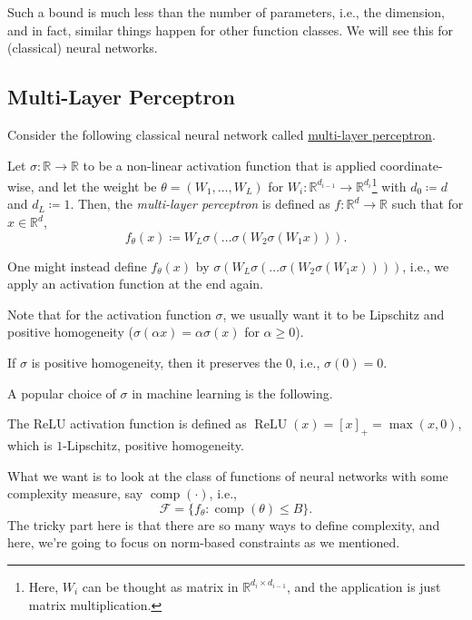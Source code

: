 Such a bound is much less than the number of parameters, i.e., the dimension, and in fact, similar things happen for other function classes. We will see this for (classical) neural networks.

\subsection{Multi-Layer Perceptron}
Consider the following classical neural network called \hyperref[def:MLP]{multi-layer perceptron}.

\begin{definition}\label{def:MLP}
	Let \(\sigma \colon \mathbb{R} \to \mathbb{R} \) to be a non-linear activation function that is applied coordinate-wise, and let the weight be \(\theta = (W_1, \dots , W_L)\) for \(W_i \colon \mathbb{R} ^{d_{i-1} } \to \mathbb{R} ^{d_i}\)\footnote{Here, \(W_i\) can be thought as matrix in \(\mathbb{R} ^{d_i \times d_{i-1}}\), and the application is just matrix multiplication.} with \(d_0 \coloneqq d\) and \(d_L \coloneqq 1\). Then, the \emph{multi-layer perceptron} is defined as \(f\colon \mathbb{R} ^d \to \mathbb{R} \) such that for \(x\in \mathbb{R} ^d\),
	\[
		f_\theta (x) \coloneqq W_L \sigma (\dots \sigma (W_2 \sigma (W_1 x))).
	\]
\end{definition}

\begin{note}
	One might instead define \(f_\theta (x)\) by \(\sigma (W_L \sigma ( \dots \sigma (W_2 \sigma (W_1 x))))\), i.e., we apply an activation function at the end again.
\end{note}

Note that for the activation function \(\sigma \), we usually want it to be Lipschitz and positive homogeneity (\(\sigma (\alpha x) = \alpha \sigma (x)\) for \(\alpha \geq 0\)).

\begin{note}
	If \(\sigma \) is positive homogeneity, then it preserves the \(0\), i.e., \(\sigma (0) = 0\).
\end{note}

A popular choice of \(\sigma \) in machine learning is the following.

\begin{eg}[ReLU]
	The ReLU activation function is defined as \(\operatorname{ReLU}(x) = [x]_+ = \max (x, 0)\), which is \(1\)-Lipschitz, positive homogeneity.
\end{eg}

What we want is to look at the class of functions of neural networks with some complexity measure, say \(\operatorname{comp}(\cdot) \), i.e.,
\[
	\mathscr{F} = \{ f_\theta \colon \operatorname{comp}(\theta ) \leq B \}.
\]
The tricky part here is that there are so many ways to define complexity, and here, we're going to focus on norm-based constraints as we mentioned.

